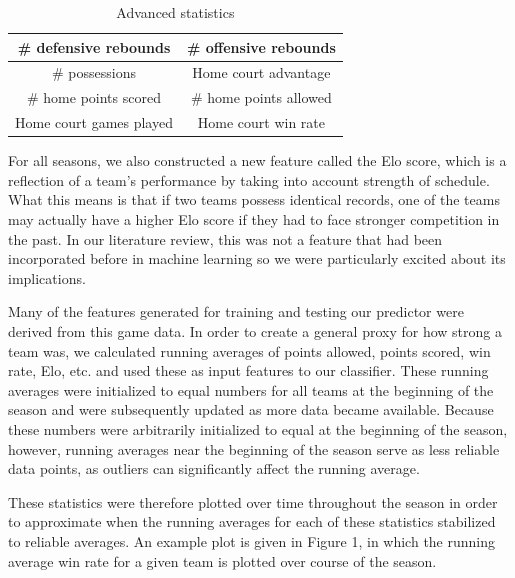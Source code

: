 \documentclass{article}
\begin{document}
\begin{table}
  \begin{center}
    \begin{tabular}{ | c | c |}
      \hline
		\# defensive rebounds & \# offensive rebounds  \\ \hline
		\# possessions &  Home court advantage      \\ \hline
    \# home points scored   & \# home points allowed        \\ \hline
    Home court games played   & Home court win rate      \\ \hline
    \end{tabular}
  \end{center}
  \caption{Advanced statistics}
\end{table}

For all seasons, we also constructed a new feature called the Elo score, which is a reflection of a team's performance by taking into account strength of schedule. What this means is that if two teams possess identical records, one of the teams may actually have a higher Elo score if they had to face stronger competition in the past. In our literature review, this was not a feature that had been incorporated before in machine learning so we were particularly excited about its implications.

Many of the features generated for training and testing our predictor were derived from this game data. In order to create a general proxy for how strong a team was, we calculated running averages of points allowed, points scored, win rate, Elo, etc. and used these as input features to our classifier. These running averages were initialized to equal numbers for all teams at the beginning of the season and were subsequently updated as more data became available. Because these numbers were arbitrarily initialized to equal at the beginning of the season, however, running averages near the beginning of the season serve as less reliable data points, as outliers can significantly affect the running average.

These statistics were therefore plotted over time throughout the season in order to approximate when the running averages for each of these statistics stabilized to reliable averages. An example plot is given in Figure 1, in which the running average win rate for a given team is plotted over course of the season.
\end{document}
